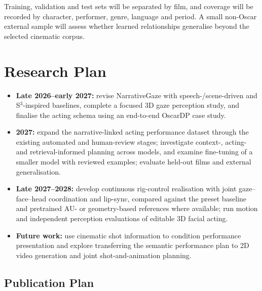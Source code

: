 \documentclass[11pt,a4paper]{article}
\begin{document}
Training, validation and test sets will be separated by film, and coverage will be recorded by character, performer, genre, language and period. A small non-Oscar external sample will assess whether learned relationships generalise beyond the selected cinematic corpus.

\section{Research Plan}

\begin{itemize}
\item \textbf{Late 2026--early 2027:} revise NarrativeGaze with speech-/scene-driven and S$^3$-inspired baselines, complete a focused 3D gaze perception study, and finalise the acting schema using an end-to-end OscarDP case study.
\item \textbf{2027:} expand the narrative-linked acting performance dataset through the existing automated and human-review stages; investigate context-, acting- and retrieval-informed planning across models, and examine fine-tuning of a smaller model with reviewed examples; evaluate held-out films and external generalisation.
\item \textbf{Late 2027--2028:} develop continuous rig-control realisation with joint gaze--face--head coordination and lip-sync, compared against the preset baseline and pretrained AU- or geometry-based references where available; run motion and independent perception evaluations of editable 3D facial acting.
\item \textbf{Future work:} use cinematic shot information to condition performance presentation and explore transferring the semantic performance plan to 2D video generation and joint shot-and-animation planning.
\end{itemize}

\subsection*{Publication Plan}
\end{document}
